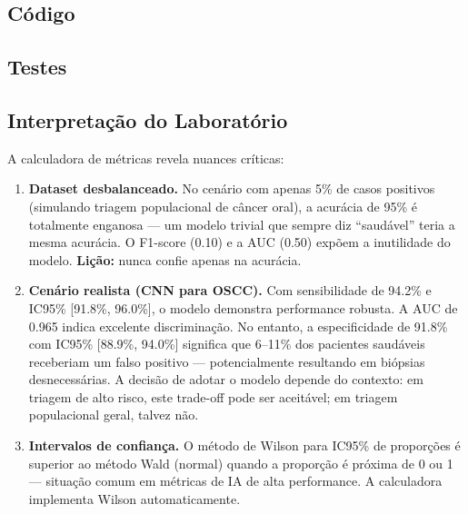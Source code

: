 \subsection{Código}


\subsection{Testes}



\subsection{Interpretação do Laboratório}

A calculadora de métricas revela nuances críticas:

\begin{enumerate}
    \item \textbf{Dataset desbalanceado.} No cenário com apenas 5\% de casos positivos (simulando triagem populacional de câncer oral), a acurácia de 95\% é totalmente enganosa — um modelo trivial que sempre diz ``saudável'' teria a mesma acurácia. O F1-score (0.10) e a AUC (0.50) expõem a inutilidade do modelo. \textbf{Lição:} nunca confie apenas na acurácia.

    \item \textbf{Cenário realista (CNN para OSCC).} Com sensibilidade de 94.2\% e IC95\% [91.8\%, 96.0\%], o modelo demonstra performance robusta. A AUC de 0.965 indica excelente discriminação. No entanto, a especificidade de 91.8\% com IC95\% [88.9\%, 94.0\%] significa que 6--11\% dos pacientes saudáveis receberiam um falso positivo — potencialmente resultando em biópsias desnecessárias. A decisão de adotar o modelo depende do contexto: em triagem de alto risco, este trade-off pode ser aceitável; em triagem populacional geral, talvez não.

    \item \textbf{Intervalos de confiança.} O método de Wilson para IC95\% de proporções é superior ao método Wald (normal) quando a proporção é próxima de 0 ou 1 — situação comum em métricas de IA de alta performance. A calculadora implementa Wilson automaticamente.
\end{enumerate}

